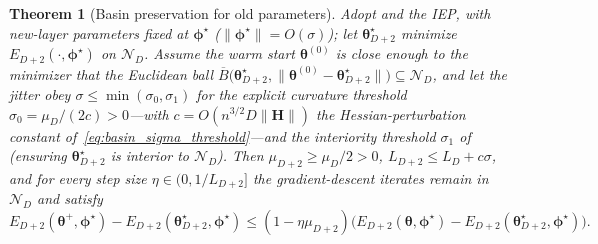 \documentclass[11pt]{article}
\newcommand{\cN}{\mathcal{N}}
\newtheorem{theorem}{Theorem}[section]
\theoremstyle{plain}
\theoremstyle{plain}
\begin{document}
\begin{theorem}[Basin preservation for old parameters]
\label{thm:basin}
  Adopt  and the IEP, with new-layer parameters
  fixed at $\bm\phi^\star$ ($\|\bm\phi^\star\|=O(\sigma)$); let
  $\bm\theta_{D+2}^\star$ minimize $E_{D+2}(\cdot,\bm\phi^\star)$ on
  $\cN_D$.  Assume the warm start $\bm\theta^{(0)}$ is close enough to the
  minimizer that the Euclidean ball
  $\overline{B}\bigl(\bm\theta_{D+2}^\star,\|\bm\theta^{(0)}
  -\bm\theta_{D+2}^\star\|\bigr)\subseteq\cN_D$, and let the jitter obey
  $\sigma\le\min(\sigma_0,\sigma_1)$ for the explicit curvature threshold
  $\sigma_0=\mu_D/(2c)>0$---with $c=O(n^{3/2}D\|\mathbf{H}\|)$ the
  Hessian-perturbation constant of~\eqref{eq:basin_sigma_threshold}---and the
  interiority threshold $\sigma_1$ of  (ensuring
  $\bm\theta_{D+2}^\star$ is interior to $\cN_D$).  Then $\mu_{D+2}\ge\mu_D/2>0$,
  $L_{D+2}\le L_D+c\sigma$, and for every step size
  $\eta\in(0,1/L_{D+2}]$ the gradient-descent iterates remain in $\cN_D$
  and satisfy
  \begin{equation}\label{eq:linear_rate}
    E_{D+2}(\bm\theta^+,\bm\phi^\star)-E_{D+2}(\bm\theta_{D+2}^\star,\bm\phi^\star)
    \le(1-\eta\mu_{D+2})\bigl(E_{D+2}(\bm\theta,\bm\phi^\star)
    -E_{D+2}(\bm\theta_{D+2}^\star,\bm\phi^\star)\bigr).
  \end{equation}
\end{theorem}
\end{document}
